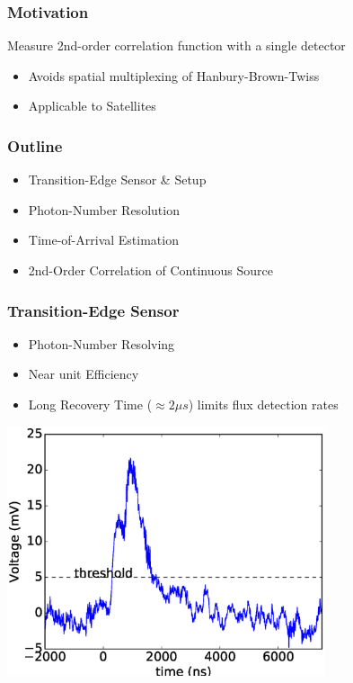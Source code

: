 \begin{frame}\frametitle{Motivation}
  \begin{center}
      \begin{block}{Measure 2nd-order correlation function with a single detector}
      \begin{itemize}
        \item Avoids spatial multiplexing of Hanbury-Brown-Twiss
        \item Applicable to Satellites  
      \end{itemize}
      \end{block}
    \end{center}
\end{frame}

\begin{frame}\frametitle{Outline}
  \begin{itemize}
    \item Transition-Edge Sensor \& Setup
    \item Photon-Number Resolution
    \item Time-of-Arrival Estimation
    \item 2nd-Order Correlation of Continuous Source
  \end{itemize}
\end{frame}

\begin{frame}\frametitle{Transition-Edge Sensor}
  \begin{center}
      \begin{itemize}
        \item Photon-Number Resolving
        \item Near unit Efficiency
        \item Long Recovery Time ($\approx 2 \mu s$) limits flux detection rates\
      \end{itemize}
    \includegraphics[width=0.7\textwidth]{images/comparator/overlapping_pulses.eps}
    \end{center}
\end{frame}

